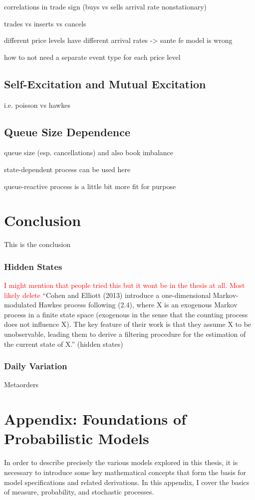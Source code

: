 \documentclass[honours,12pt]{unswthesis}
\numberwithin{equation}{section}
\begin{document}
correlations in trade sign (buys vs sells arrival rate nonstationary)

trades vs inserts vs cancels

different price levels have different arrival rates -> sante fe model is wrong

how to not need a separate event type for each price level

\section{Self-Excitation and Mutual Excitation}
i.e. poisson vs hawkes

\section{Queue Size Dependence}
queue size (esp. cancellations) and also book imbalance

state-dependent process can be used here

queue-reactive process is a little bit more fit for purpose

\chapter{Conclusion}\label{ccl}


This is the conclusion

\subsection{Hidden States}
\textcolor{red}{I might mention that people tried this but it wont be in the thesis at all. Most likely delete}
``Cohen and Elliott (2013) introduce a one-dimensional Markov-modulated Hawkes process following (2.4), where X is an exogenous Markov process in a finite state space (exogenous in the sense that the counting process does not influence X).  The key feature of their work is that they assume X to be unobservable, leading them to derive a filtering procedure for the estimation of the current state of X.'' (hidden states)
\subsection{Daily Variation}
Metaorders

\chapter{Appendix: Foundations of Probabilistic Models}
In order to describe precisely the various models explored in this thesis, it is necessary to introduce some key mathematical concepts that form the basis for model specifications and related derivations. In this appendix, I cover the basics of measure, probability, and stochastic processes.
\end{document}
